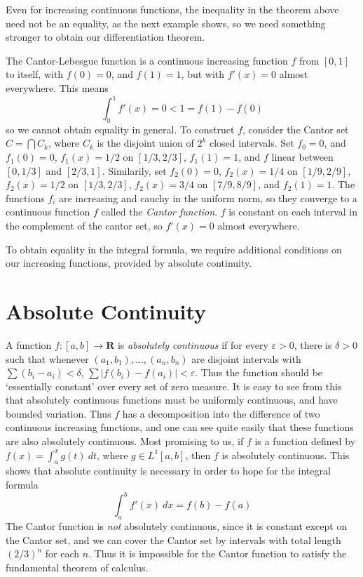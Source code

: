 Even for increasing continuous functions, the inequality in the theorem above need not be an equality, as the next example shows, so we need something stronger to obtain our differentiation theorem.

\begin{example}
  The Cantor-Lebesgue function is a continuous increasing function $f$ from $[0,1]$ to itself, with $f(0) = 0$, and $f(1) = 1$, but with $f'(x) = 0$ almost everywhere. This means
  \[ \int_0^1 f'(x) = 0 < 1 = f(1) - f(0) \]
  so we cannot obtain equality in general. To construct $f$, consider the Cantor set $C = \bigcap C_k$, where $C_k$ is the disjoint union of $2^k$ closed intervals. Set $f_0 = 0$, and $f_1(0) = 0$, $f_1(x) = 1/2$ on $[1/3,2/3]$, $f_1(1) = 1$, and $f$ linear between $[0,1/3]$ and $[2/3,1]$. Similarily, set $f_2(0) = 0$, $f_2(x) = 1/4$ on $[1/9, 2/9]$, $f_2(x) = 1/2$ on $[1/3,2/3]$, $f_2(x) = 3/4$ on $[7/9,8/9]$, and $f_2(1) = 1$. The functions $f_i$ are increasing and cauchy in the uniform norm, so they converge to a continuous function $f$ called the \emph{Cantor function}. $f$ is constant on each interval in the complement of the cantor set, so $f'(x) = 0$ almost everywhere.
\end{example}

To obtain equality in the integral formula, we require additional conditions on our increasing functions, provided by absolute continuity.

\section{Absolute Continuity}

A function $f: [a,b] \to \mathbf{R}$ is \emph{absolutely continuous} if for every $\varepsilon > 0$, there is $\delta > 0$ such that whenever $(a_1, b_1), \dots, (a_n,b_n)$ are disjoint intervals with $\sum (b_i - a_i) < \delta$, $\sum |f(b_i) - f(a_i)| < \varepsilon$. Thus the function should be `essentially constant' over every set of zero measure. It is easy to see from this that absolutely continuous functions must be uniformly continuous, and have bounded variation. Thus $f$ has a decomposition into the difference of two continuous increasing functions, and one can see quite easily that these functions are also absolutely continuous. Most promising to us, if $f$ is a function defined by $f(x) = \int_a^x g(t)\ dt$, where $g \in L^1[a,b]$, then $f$ is absolutely continuous. This shows that absolute continuity is necessary in order to hope for the integral formula
%
\[ \int_a^b f'(x)\ dx = f(b) - f(a) \]
%
The Cantor function is {\it not} absolutely continuous, since it is constant except on the Cantor set, and we can cover the Cantor set by intervals with total length $(2/3)^n$ for each $n$. Thus it is impossible for the Cantor function to satisfy the fundamental theorem of calculus.

